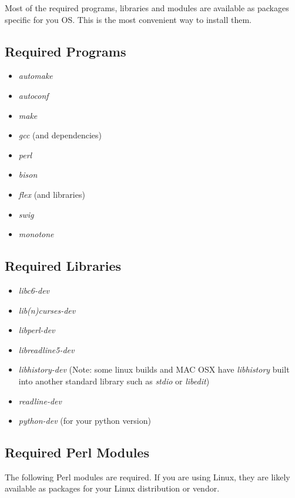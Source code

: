 \documentclass[12pt]{article}
\begin{document}
Most of the required programs, libraries and modules are available as
packages specific for you OS.  This is the most convenient way to install them.

\subsection*{Required Programs}

\begin{itemize}
\item {\it automake}
\item {\it autoconf}
\item {\it make}
\item {\it gcc} (and dependencies)
\item {\it perl}
\item {\it bison}
\item {\it flex} (and libraries)
\item {\it swig}
\item {\it monotone}
\end{itemize} 

\subsection*{Required Libraries}

\begin{itemize}
\item {\it libc6-dev}
\item {\it lib(n)curses-dev}
\item {\it libperl-dev}
\item {\it libreadline5-dev}
\item {\it libhistory-dev} (Note: some linux builds and MAC OSX have
  {\it libhistory} built into another standard library such as {\it
    stdio} or {\it libedit})
\item {\it readline-dev}
\item {\it python-dev} (for your python version)
\end{itemize} 

\subsection*{Required Perl Modules}

The following Perl modules are required.  If you are using Linux, they
are likely available as packages for your Linux distribution or vendor.
\end{document}
